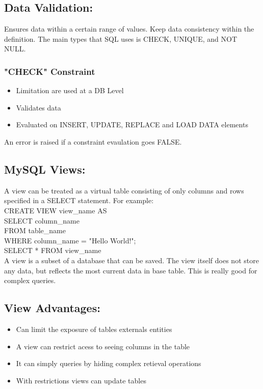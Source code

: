 \documentclass[a5paper]{article}
\begin{document}
	\subsection{Data Validation:}
	Ensures data within a certain range of values. Keep data consistency within the definition. The main types that SQL uses is CHECK, UNIQUE, and NOT NULL.
	\subsubsection{"CHECK" Constraint}
	\begin{itemize}
		\item Limitation are used at a DB Level
		\item Validates data
		\item Evaluated on INSERT, UPDATE, REPLACE and LOAD DATA elements
	\end{itemize}
	An error is raised if a constraint evaulation goes FALSE.
	\subsection{MySQL Views:}
	A view can be treated as a virtual table consisting of only columns and rows specified in a SELECT statement. For example:\\
	CREATE VIEW view\_name AS\\
	\indent\indent SELECT column\_name\\
	\indent\indent FROM table\_name\\
	\indent\indent WHERE column\_name = "Hello World!";\\[1\baselineskip]
	SELECT * FROM view\_name\\[1\baselineskip]
	A view is a subset of a database that can be saved. The view itself does not store any data, but reflects the most current data in base table. This is really good for complex queries.
	\subsection{View Advantages:}
	\begin{itemize}
		\item Can limit the exposure of tables externals entities
		\item A view can restrict acess to seeing columns in the table
		\item It can simply queries by hiding complex retieval operations
		\item With restrictions views can update tables
	\end{itemize}
\end{document}

